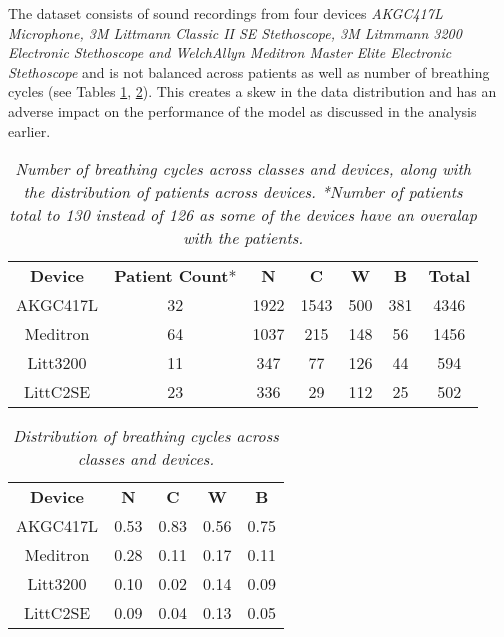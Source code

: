 \documentclass{article}
\begin{document}
The dataset consists of sound recordings from four devices \textit{AKGC417L Microphone, 3M Littmann Classic II SE Stethoscope, 3M Litmmann 3200 Electronic Stethoscope and WelchAllyn Meditron Master Elite Electronic Stethoscope} and is not balanced across patients as well as number of breathing cycles (see Tables \ref{tab:cyles_class_device}, \ref{tab:per_class_device}). This creates a skew in the data distribution and has an adverse impact on the performance of the model as discussed in the analysis earlier.
\begin{table}[!htbp]
    \centering
    \small
    \begin{tabular}{c | c | c c c c c}
    \toprule
	\textbf{Device} & \multicolumn{1}{m{1cm}|}{\textbf{Patient Count}*} & \textbf{N} & \textbf{C} & \textbf{W}	& \textbf{B} & \textbf{Total}\\
    \cmidrule(lr){1-1}
    \cmidrule(lr){2-2}
    \cmidrule(lr){3-7}
    AKGC417L & 32 & 1922 & 1543 & 500 & 381 & 4346\\
    Meditron & 64 & 1037 & 215 & 148 & 56 & 1456\\	
    Litt3200 & 11 & 347 & 77 & 126 & 44 & 594\\
    LittC2SE & 23 & 336 & 29 & 112 & 25 & 502\\
    \bottomrule
    \end{tabular}
    \caption{\textit{Number of breathing cycles across classes and devices, along with the distribution of patients across devices.
    \newline
    *Number of patients total to 130 instead of 126 as some of the devices have an overalap with the patients.}
    }
    \label{tab:cyles_class_device}
\end{table}


\begin{table}[!htbp]
    \centering
    \begin{tabular}{c | c c c c}
    \toprule
	\textbf{Device} & \textbf{N} & \textbf{C} & \textbf{W}	& \textbf{B}\\
    \cmidrule(lr){1-1}
    \cmidrule(lr){2-5}
	AKGC417L & 0.53 & 0.83 & 0.56 & 0.75\\
    Meditron & 0.28 & 0.11 & 0.17 & 0.11\\
	Litt3200 & 0.10 & 0.02 & 0.14 & 0.09\\
	LittC2SE & 0.09 & 0.04 & 0.13	& 0.05\\
    \bottomrule
    \end{tabular}
    \caption{\textit{Distribution of breathing cycles across classes and devices.}}
    \label{tab:per_class_device}
\end{table}
 
\end{document}

